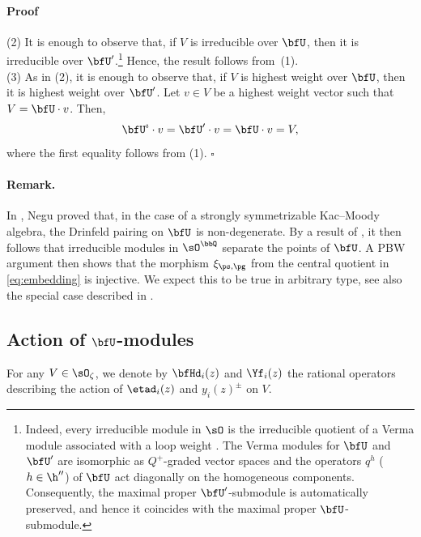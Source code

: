 \documentclass[reqno]{amsart}
\numberwithin{equation}{section}
\newenvironment{pf}{\medskip\paragraph{{\sc Proof}}}{\hfill$\square$\par\medskip}
\newenvironment{remark}{\medskip\paragraph{{\bf Remark.}}}{\par\medskip}
\begin{document}
\begin{pf}
(2) It is enough to observe that, if $V$ is irreducible over $\bfU$,
then it is irreducible over $\bfU'$.\footnote{
Indeed, every irreducible
	module in $\sO$ is the irreducible quotient of a Verma module associated
	with a loop weight \cite{hernandez-05}. The Verma modules for $\bfU$ and
	$\bfU'$ are isomorphic as $Q^+$-graded vector spaces and the operators $q^h$ ($h\in\h''$) of $\bfU$
	act diagonally on the homogeneous components. 
	Consequently, the maximal proper $\bfU'$-submodule is
	automatically preserved, and hence it coincides with the maximal proper $\bfU$-submodule.}
Hence, the result follows from~(1).\\

(3) As in (2), it is enough to observe that, if $V$ is highest weight over $\bfU$, then 
it is highest weight over $\bfU'$. Let $v\in V$ be a highest weight vector such that $V=\bfU\cdot v$. Then, 
\[
\bfU^\imath\cdot v=\bfU'\cdot v=\bfU\cdot v=V,
\]
where the first equality follows from (1).
\end{pf}

\begin{remark}
In \cite[Sec.~3.2]{negut-26}, Negu proved that, in the case of a strongly symmetrizable Kac--Moody algebra, the Drinfeld pairing on $\bfU$ is non-degenerate.
By a result of \cite{appel-gautam-26}, it then follows that irreducible modules in $\sO^{\bbQ}$ separate the points of $\bfU$.
A PBW argument then shows that the morphism $\xi_{\ps,\pg}$ from the central quotient in \eqref{eq:embedding} is injective.
We expect this to be true in arbitrary type, see also the special case described in \cite[Thm.~4.13]{lu-pan-26}.
\hfill\rmkend
\end{remark}


\subsection{Action of $\bfU$-modules}
For any $V\in\sO_\zeta$, we denote by $\bfHd_i(z)$ and $\Yf_i(z)$ the rational operators
describing the action of $\etad_{i}(z)$ and $y_i(z)^{\pm}$ on $V$.
\end{document}
